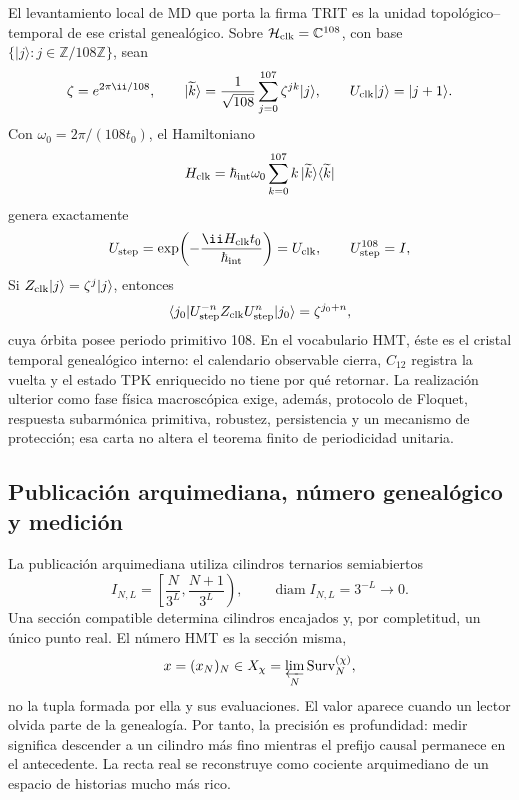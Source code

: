 {El levantamiento local de MD que porta la firma TRIT es la unidad
topológico--temporal de ese cristal genealógico.
Sobre
\(\mathcal H_{\rm clk}=\mathbb C^{108}\), con base
\(\{|j\rangle:j\in\mathbb Z/108\mathbb Z\}\), sean
\[
\zeta=e^{2\pi\ii/108},\qquad
|\widetilde k\rangle=\frac1{\sqrt{108}}
\sum_{j=0}^{107}\zeta^{jk}|j\rangle,
\qquad U_{\rm clk}|j\rangle=|j+1\rangle.
\]
Con \(\omega_0=2\pi/(108t_0)\), el Hamiltoniano
\begin{equation}
H_{\rm clk}=\hbar_{\rm int}\omega_0
\sum_{k=0}^{107}k\,|\widetilde k\rangle\langle\widetilde k|
\label{p12-83-c3-s1:eq:trit-time-crystal-hamiltonian}
\end{equation}
genera exactamente
\begin{equation}
U_{\rm step}=\exp\!\left(
-\frac{\ii H_{\rm clk}t_0}{\hbar_{\rm int}}\right)=U_{\rm clk},
\qquad U_{\rm step}^{108}=I,
\label{p12-83-c3-s1:eq:trit-time-crystal-period}
\end{equation}
Si \(Z_{\rm clk}|j\rangle=\zeta^j|j\rangle\), entonces
\begin{equation}
\langle j_0|U_{\rm step}^{-n}Z_{\rm clk}U_{\rm step}^{n}|j_0\rangle
=\zeta^{j_0+n},
\label{p12-83-c3-s1:eq:trit-time-crystal-observable}
\end{equation}
cuya órbita posee periodo primitivo 108. En el vocabulario HMT, éste es el
cristal temporal genealógico interno: el calendario observable cierra,
\(C_{12}\) registra la vuelta y el estado TPK enriquecido no tiene por qué
retornar. La realización ulterior como fase física macroscópica exige,
además, protocolo de Floquet, respuesta subarmónica primitiva, robustez,
persistencia y un mecanismo de protección; esa carta no altera el teorema
finito de periodicidad unitaria.

\subsection{Publicación arquimediana, número genealógico y medición}

La publicación arquimediana utiliza cilindros ternarios semiabiertos
\begin{equation}
I_{N,L}=\left[\frac{N}{3^L},\frac{N+1}{3^L}\right),
\qquad \operatorname{diam}I_{N,L}=3^{-L}\longrightarrow0.
\label{p12-83-c3-s1:eq:ternary-cylinders}
\end{equation}
Una sección compatible determina cilindros encajados y, por completitud, un
único punto real. El número HMT es la sección misma,
\begin{equation}
x=(x_N)_N\in X_\chi
=\varprojlim_N\operatorname{Surv}^{(\chi)}_N,
\label{p12-83-c3-s1:eq:hmt-number-as-section}
\end{equation}
no la tupla formada por ella y sus evaluaciones. El valor aparece cuando un
lector olvida parte de la genealogía.
Por tanto, la precisión es profundidad: medir significa descender a un
cilindro más fino mientras el prefijo causal permanece en el antecedente.
La recta real se reconstruye como cociente arquimediano de un espacio de
historias mucho más rico.

}
